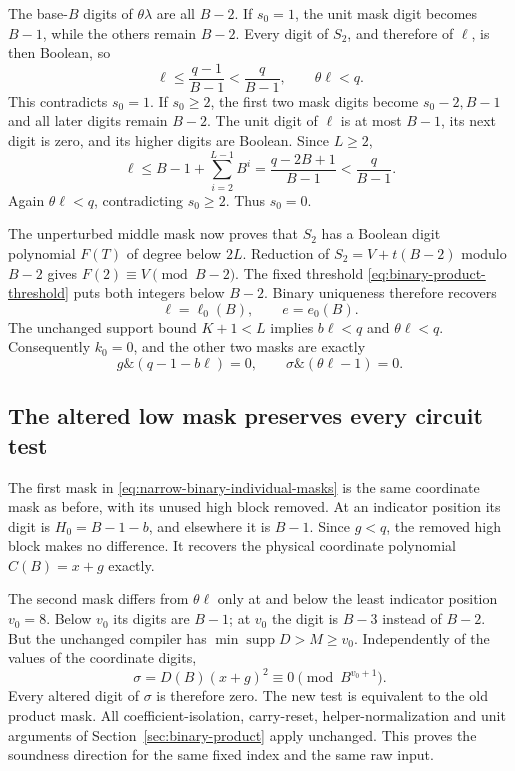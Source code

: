 The base-$B$ digits of $\theta\lambda$ are all $B-2$. If $s_0=1$,
the unit mask digit becomes $B-1$, while the others remain $B-2$.
Every digit of $S_2$, and therefore of $\ell$, is then Boolean, so
\[
 \ell\le\frac{q-1}{B-1}<\frac q{B-1},\qquad \theta\ell<q.
\]
This contradicts $s_0=1$. If $s_0\ge2$, the first two mask digits
become $s_0-2,B-1$ and all later digits remain $B-2$. The unit
digit of $\ell$ is at most $B-1$, its next digit is zero, and its
higher digits are Boolean. Since $L\ge2$,
\[
 \ell\le B-1+\sum_{i=2}^{L-1}B^i
       =\frac{q-2B+1}{B-1}<\frac q{B-1}.
\]
Again $\theta\ell<q$, contradicting $s_0\ge2$. Thus $s_0=0$.

The unperturbed middle mask now proves that $S_2$ has a Boolean
digit polynomial $F(T)$ of degree below $2L$. Reduction of
$S_2=V+t(B-2)$ modulo $B-2$ gives $F(2)\equiv V\pmod{B-2}$.
The fixed threshold \eqref{eq:binary-product-threshold} puts both
integers below $B-2$. Binary uniqueness therefore recovers
\begin{equation}\label{eq:narrow-binary-canonical}
 \ell=\ell_0(B),\qquad e=e_0(B).
\end{equation}
The unchanged support bound $K+1<L$ implies $b\ell<q$ and
$\theta\ell<q$. Consequently $k_0=0$, and the other two masks are
exactly
\begin{equation}\label{eq:narrow-binary-individual-masks}
 g\mathbin{\&}(q-1-b\ell)=0,
 \qquad \sigma\mathbin{\&}(\theta\ell-1)=0.
\end{equation}

\subsection{The altered low mask preserves every circuit test}

The first mask in \eqref{eq:narrow-binary-individual-masks} is the
same coordinate mask as before, with its unused high block removed.
At an indicator position its digit is $H_0=B-1-b$, and elsewhere
it is $B-1$. Since $g<q$, the removed high block makes no difference.
It recovers the physical coordinate polynomial $C(B)=x+g$ exactly.

The second mask differs from $\theta\ell$ only at and below the
least indicator position $v_0=8$. Below $v_0$ its digits are $B-1$;
at $v_0$ the digit is $B-3$ instead of $B-2$. But the unchanged
compiler has $\min\operatorname{supp}D>M\ge v_0$. Independently of
the values of the coordinate digits,
\[
 \sigma=D(B)(x+g)^2\equiv0\pmod{B^{v_0+1}}.
\]
Every altered digit of $\sigma$ is therefore zero. The new test is
equivalent to the old product mask. All coefficient-isolation,
carry-reset, helper-normalization and unit arguments of
Section~\ref{sec:binary-product} apply unchanged. This proves the
soundness direction for the same fixed index and the same raw input.

